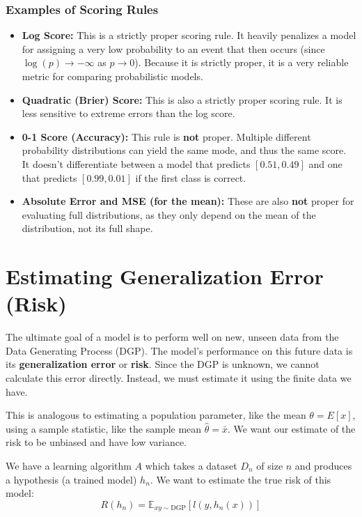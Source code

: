 \documentclass{article}
\begin{document}
\begin{multicols}{2}
	\subsubsection{Examples of Scoring Rules}
	\begin{itemize}
		\item \textbf{Log Score:} This is a strictly proper scoring rule. It heavily penalizes a model for assigning a very low probability to an event that then occurs (since $\log(p) \to -\infty$ as $p \to 0$). Because it is strictly proper, it is a very reliable metric for comparing probabilistic models.
		\item \textbf{Quadratic (Brier) Score:} This is also a strictly proper scoring rule. It is less sensitive to extreme errors than the log score.
		\item \textbf{0-1 Score (Accuracy):} This rule is \textbf{not} proper. Multiple different probability distributions can yield the same mode, and thus the same score. It doesn't differentiate between a model that predicts $[0.51, 0.49]$ and one that predicts $[0.99, 0.01]$ if the first class is correct.
		\item \textbf{Absolute Error and MSE (for the mean):} These are also \textbf{not} proper for evaluating full distributions, as they only depend on the mean of the distribution, not its full shape.
	\end{itemize}

	\section{Estimating Generalization Error (Risk)}
	The ultimate goal of a model is to perform well on new, unseen data from the Data Generating Process (DGP). The model's performance on this future data is its \textbf{generalization error} or \textbf{risk}. Since the DGP is unknown, we cannot calculate this error directly. Instead, we must estimate it using the finite data we have.

	This is analogous to estimating a population parameter, like the mean $\theta = E[x]$, using a sample statistic, like the sample mean $\hat{\theta} = \bar{x}$. We want our estimate of the risk to be unbiased and have low variance.

	We have a learning algorithm $A$ which takes a dataset $D_n$ of size $n$ and produces a hypothesis (a trained model) $h_n$. We want to estimate the true risk of this model:
	$$ R(h_n) = \mathbb{E}_{xy \sim \text{DGP}}[l(y, h_n(x))] $$


\end{multicols}
\end{document}
